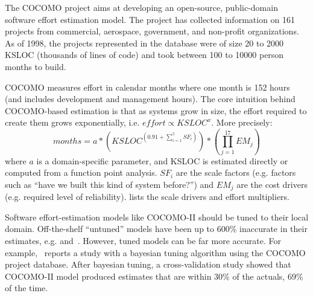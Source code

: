 The COCOMO project aims at developing an open-source,
public-domain software effort estimation model. The project has
collected information on 161 projects  from commercial, aerospace,
government, and non-profit organizations\cite{chulani99,boehm00b}. As of
1998, the projects represented in the database were of size 20 to
2000 KSLOC (thousands of lines of code) and took between 100 to
10000 person months to build.

COCOMO measures effort in calendar months where one month is 152
hours (and includes development and management hours). The core
intuition behind COCOMO-based estimation is that as systems grow
in size, the effort required to create them grows exponentially,
i.e. \mbox{$effort \varpropto KSLOC^x$}. More precisely:
\[
months=a*\left(KSLOC^{\left(0.91+\sum_{i=1}^{5}SF_i\right)}\right)*\left(\prod_{j=1}^{17}EM_j\right)
\]
where  $a$ is a domain-specific parameter, and KSLOC is  estimated
directly or computed from a function point analysis.
 $SF_i$ are the scale factors (e.g. factors
such as ``have we built this kind
 of system before?'') and
$EM_j$ are the cost drivers
(e.g.
required level of reliability).  lists the scale drivers
and effort multipliers.

Software effort-estimation models like COCOMO-II should
 be tuned to
their  local domain. Off-the-shelf ``untuned'' models have been up
to 600\% inaccurate in their estimates, e.g. \cite[p165]{mukho92}
and~\cite{kemerer87}. However, tuned models can be far more
accurate.
 For example,~\cite{chulani99}
reports a study with a bayesian tuning algorithm using the COCOMO
project database. After bayesian tuning, a cross-validation study
showed that
 COCOMO-II model produced estimates that are within 30\% of the
 actuals,
 69\% of the time.


